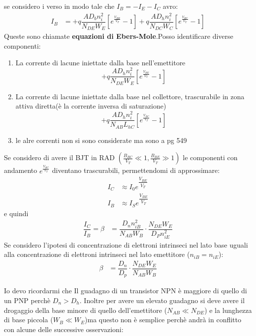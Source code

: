 se considero i verso in modo tale che $I_B=-I_E-I_C$ avro:
\begin{align}
    I_B &= +q \dfrac{AD_b n_i^2}{N_{DE} W_E} \left[ e^{\frac{V_{BE}}{V_T}}-1\right] +q \dfrac{AD_h n_i^2}{N_{DC} W_C} \left[ e^{\frac{V_{BC}}{V_T}}-1\right] 
\end{align}
Queste sono chiamate \textbf{equazioni di Ebers-Mole}.Posso identificare diverse componenti:
\begin{enumerate}
    \item La corrente di lacune iniettate dalla base nell'emettitore
        \begin{equation}
        +q \dfrac{AD_h n_i^2}{N_{DE} W_E} \left[ e^{\frac{V_{BE}}{V_T}}-1\right]
        \end{equation}
    \item La corrente di lacune iniettate dalla base nel collettore, trascurabile in zona attiva diretta(è la corrente inversa di saturazione)
        \begin{equation}
        +q \dfrac{AD_h n_i^2}{N_{AB} L_{hC}} \left[ e^{\frac{V_{BC}}{V_T}}-1\right]
        \end{equation}
    \item le alre correnti non si sono considerate ma sono a pg 549
\end{enumerate}
Se considero di avere il BJT in RAD $\left( \frac{B_{BC}}{V_T}\ll 1,\frac{B_{BE}}{V_T}\gg 1 \right)$ le componenti con andamento $e^{\frac{V_{BC}}{V_T}}$ diventano trascurabili, permettendomi di approssimare:
\begin{align}
    I_C &\approx I_0 e^{\dfrac{V_{BE}}{V_T}}\\
    I_B &\approx I_S e^{\dfrac{V_{BE}}{V_T}}
\end{align}
e quindi
\begin{align}
    \dfrac{I_C}{I_B}=\beta&=\dfrac{D_n n_{iB}^2}{N_{AB}W_B} \cdot \dfrac{N_{DE}W_E}{D_P n_{iE}^2}
\end{align}
    Se considero l'ipotesi di concentrazione di elettroni intrinseci nel lato base uguali alla concentrazione di elettroni intrinseci nel lato emettitore ($n_{iB}=n_{iE}$):
    \begin{align}
    \beta&=\dfrac{D_n}{D_p} \cdot \dfrac{N_{DE}W_E}{N_{AB} W_B}
\end{align}

Io devo ricordarmi che Il guadagno di un transistor NPN è maggiore di quello di un PNP perchè $D_n>D_h$. Inoltre per avere un elevato guadagno si deve avere il drogaggio della base minore di quello dell'emettitore  ($N_{AB} \ll N_{DE}$) e la lunghezza di base piccola ($W_B \ll W_E$)ma questo non è semplice perchè andrà in conflitto con alcune delle successive osservazioni:

